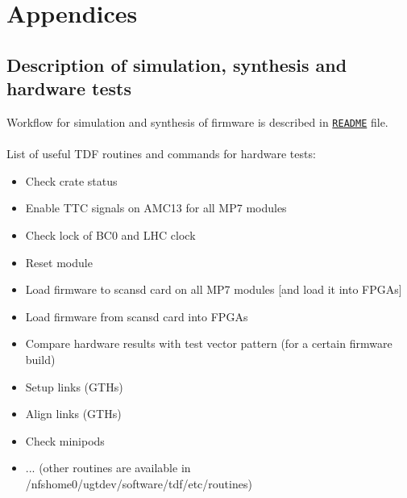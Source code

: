 \section{Appendices}\label{sec:app:app}

\subsection{Description of simulation, synthesis and hardware tests}\label{sec:app:app_e}

Workflow for simulation and synthesis of firmware is described in \href{\gitbranch/README.md}{\texttt{README}} file.\\\\
List of useful TDF routines and commands for hardware tests:
\begin{itemize}
\item Check crate status\\
\item Enable TTC signals on AMC13 for all MP7 modules\\
\item Check lock of BC0 and LHC clock\\
\item Reset module\\
\item Load firmware to scansd card on all MP7 modules [and load it into FPGAs]\\
\item Load firmware from scansd card into FPGAs\\
\item Compare hardware results with test vector pattern (for a certain firmware build)\\
\item Setup links (GTHs)\\
\item Align links (GTHs)\\
\item Check minipods\\
\item ... (other routines are available in /nfshome0/ugtdev/software/tdf/etc/routines)
\end{itemize}


